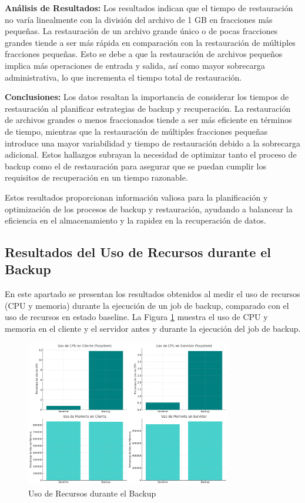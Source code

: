 \textbf{Análisis de Resultados:}
Los resultados indican que el tiempo de restauración no varía linealmente con la división del archivo de 1 GB en fracciones más pequeñas. La restauración de un archivo grande único o de pocas fracciones grandes tiende a ser más rápida en comparación con la restauración de múltiples fracciones pequeñas. Esto se debe a que la restauración de archivos pequeños implica más operaciones de entrada y salida, así como mayor sobrecarga administrativa, lo que incrementa el tiempo total de restauración.



\textbf{Conclusiones:}
Los datos resaltan la importancia de considerar los tiempos de restauración al planificar estrategias de backup y recuperación. La restauración de archivos grandes o menos fraccionados tiende a ser más eficiente en términos de tiempo, mientras que la restauración de múltiples fracciones pequeñas introduce una mayor variabilidad y tiempo de restauración debido a la sobrecarga adicional. Estos hallazgos subrayan la necesidad de optimizar tanto el proceso de backup como el de restauración para asegurar que se puedan cumplir los requisitos de recuperación en un tiempo razonable.

Estos resultados proporcionan información valiosa para la planificación y optimización de los procesos de backup y restauración, ayudando a balancear la eficiencia en el almacenamiento y la rapidez en la recuperación de datos.


  \subsection{Resultados del Uso de Recursos durante el Backup}

En este apartado se presentan los resultados obtenidos al medir el uso de recursos (CPU y memoria) durante la ejecución de un job de backup, comparado con el uso de recursos en estado baseline. La Figura \ref{fig:uso-recursos} muestra el uso de CPU y memoria en el cliente y el servidor antes y durante la ejecución del job de backup.

\begin{figure}[H]
    \centering
    \includegraphics[width=0.8\textwidth]{uso_de_recursos.png}
    \caption{Uso de Recursos durante el Backup}
    \label{fig:uso-recursos}
\end{figure}

